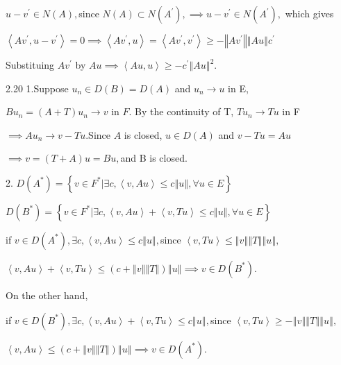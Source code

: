 \documentclass{article}
\begin{document}
$u-v^{\prime }\in N\left( A\right) ,$since $N\left( A\right) \subset N\left(
A^{\prime }\right) ,\implies u-v^{\prime }\in N\left( A^{\prime }\right) ,$%
which gives 

$\left\langle Av^{\prime },u-v^{\prime }\right\rangle =0\implies
\left\langle Av^{\prime },u\right\rangle =\left\langle Av^{\prime
},v^{\prime }\right\rangle \geq -\left\Vert Av^{\prime }\right\Vert
\left\Vert Au\right\Vert c^{\prime }$

Substituing $Av^{\prime }$ by $Au\implies \left\langle Au,u\right\rangle
\geq -c^{\prime }\left\Vert Au\right\Vert ^{2}.$

2.20 1.Suppose $u_{n}\in D\left( B\right) =D\left( A\right) $ and $%
u_{n}\rightarrow u$ in E, 

$Bu_{n}=\left( A+T\right) u_{n}\rightarrow v$ in $F.$ By the continuity of
T, $Tu_{n}\rightarrow Tu$ in F

$\implies Au_{n}\rightarrow v-Tu.$Since $A$ is closed, $u\in D\left(
A\right) $ and $v-Tu=Au$

$\implies v=\left( T+A\right) u=Bu,$and B is closed.

2. $D\left( A^{\ast }\right) =\left\{ v\in F^{\ast }|\exists c,\left\langle
v,Au\right\rangle \leq c\left\Vert u\right\Vert ,\forall u\in E\right\} $

$D\left( B^{\ast }\right) =\left\{ v\in F^{\ast }|\exists c,\left\langle
v,Au\right\rangle +\left\langle v,Tu\right\rangle \leq c\left\Vert
u\right\Vert ,\forall u\in E\right\} $

if $v\in D\left( A^{\ast }\right) ,\exists c,\left\langle v,Au\right\rangle
\leq c\left\Vert u\right\Vert ,$since $\left\langle v,Tu\right\rangle \leq
\left\Vert v\right\Vert \left\Vert T\right\Vert \left\Vert u\right\Vert ,$

$\left\langle v,Au\right\rangle +\left\langle v,Tu\right\rangle \leq \left(
c+\left\Vert v\right\Vert \left\Vert T\right\Vert \right) \left\Vert
u\right\Vert \implies v\in D\left( B^{\ast }\right) .$

On the other hand,

\bigskip if $v\in D\left( B^{\ast }\right) ,\exists c,\left\langle
v,Au\right\rangle +\left\langle v,Tu\right\rangle \leq c\left\Vert
u\right\Vert ,$since $\left\langle v,Tu\right\rangle \geq -\left\Vert
v\right\Vert \left\Vert T\right\Vert \left\Vert u\right\Vert ,$

$\left\langle v,Au\right\rangle \leq \left( c+\left\Vert v\right\Vert
\left\Vert T\right\Vert \right) \left\Vert u\right\Vert \implies v\in
D\left( A^{\ast }\right) .$
\end{document}
